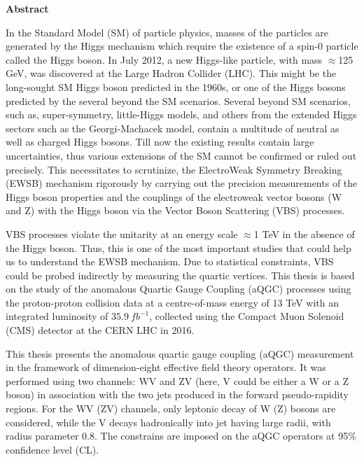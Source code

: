\begin{center}
  \textbf{\large{Abstract}}
\end{center} 
In the Standard Model (SM) of particle physics, masses of the particles are generated by the Higgs mechanism which require the existence of a spin-0 particle called the Higgs boson. In July 2012, a new Higgs-like particle, with mass $\approx$125 GeV, was discovered at the Large Hadron Collider (LHC). This might be the long-sought SM Higgs boson predicted in the 1960s, or one of the Higgs bosons predicted by the several beyond the SM scenarios. Several beyond SM scenarios, such as, super-symmetry, little-Higgs models, and others from the extended Higgs sectors such as the Georgi-Machacek model, contain a multitude of neutral as well as charged Higgs bosons. Till now the existing results contain large uncertainties, thus various extensions of the SM cannot be confirmed or ruled out precisely.
This necessitates to scrutinize, the ElectroWeak Symmetry Breaking (EWSB) mechanism rigorously by carrying out the precision measurements of the Higgs boson properties and the couplings of the electroweak vector bosons (W and Z) with the Higgs boson via the Vector Boson Scattering (VBS) processes.

VBS processes violate the unitarity at an energy scale $\approx$1 TeV in the absence of the Higgs boson. Thus, this is one of the most important studies that could help us to understand the EWSB mechanism. Due to statistical constraints, VBS could be probed indirectly by measuring the quartic vertices. This thesis is based on the study of the anomalous Quartic Gauge Coupling (aQGC) processes using the proton-proton collision data at a centre-of-mass energy of 13 TeV with an integrated luminosity of $35.9~fb^{-1}$, collected using the Compact Muon Solenoid (CMS) detector at the CERN LHC in 2016.

This thesis presents the anomalous quartic gauge coupling (aQGC) measurement in the framework of dimension-eight effective field theory operators. It was performed using two channels: WV and ZV (here, V could be either a W or a Z boson) in association with the two jets produced in the forward pseudo-rapidity regions. For the WV (ZV) channels, only leptonic decay of W (Z) bosons are considered, while the V decays hadronically into jet having large radii, with radius parameter 0.8. The constrains are imposed on the aQGC operators at 95\% confidence level (CL).

